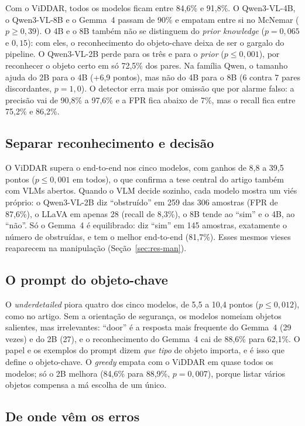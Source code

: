 \documentclass[conference]{IEEEtran}
\begin{document}
Com o ViDDAR, todos os modelos ficam entre 84,6\% e 91,8\%. O Qwen3-VL-4B, o Qwen3-VL-8B e o Gemma~4
passam de 90\% e empatam entre si no McNemar ($p\geq 0{,}39$). O 4B e o 8B também não se distinguem do
\emph{prior knowledge} ($p=0{,}065$ e $0{,}15$): com eles, o reconhecimento do objeto-chave deixa de ser
o gargalo do pipeline. O Qwen3-VL-2B perde para os três e para o \emph{prior} ($p\leq 0{,}001$), por
reconhecer o objeto certo em só 72,5\% dos pares. Na família Qwen, o tamanho ajuda do 2B para o 4B
(+6,9 pontos), mas não do 4B para o 8B (6 contra 7 pares discordantes, $p=1{,}0$). O detector erra mais
por omissão que por alarme falso: a precisão vai de 90,8\% a 97,6\% e a FPR fica abaixo de 7\%, mas o
recall fica entre 75,2\% e 86,2\%.

\subsection{Separar reconhecimento e decisão}
O ViDDAR supera o end-to-end nos cinco modelos, com ganhos de 8,8 a 39,5 pontos ($p\leq 0{,}001$ em
todos), o que confirma a tese central do artigo também com VLMs abertos. Quando o VLM decide sozinho, cada
modelo mostra um viés próprio: o Qwen3-VL-2B diz ``obstruído'' em 259 das 306 amostras (FPR de 87,6\%),
o LLaVA em apenas 28 (recall de 8,3\%), o 8B tende ao ``sim'' e o 4B, ao ``não''. Só o Gemma~4 é
equilibrado: diz ``sim'' em 145 amostras, exatamente o número de obstruídas, e tem o melhor end-to-end
(81,7\%). Esses mesmos vieses reaparecem na manipulação (Seção~\ref{sec:res-man}).

\subsection{O prompt do objeto-chave}
O \emph{underdetailed} piora quatro dos cinco modelos, de 5,5 a 10,4 pontos ($p\leq 0{,}012$), como no
artigo. Sem a orientação de segurança, os modelos nomeiam objetos salientes, mas irrelevantes: ``door''
é a resposta mais frequente do Gemma~4 (29 vezes) e do 2B (27), e o reconhecimento do Gemma~4 cai de
88,6\% para 62,1\%. O papel e os exemplos do prompt dizem \emph{que tipo} de objeto importa, e é isso que
define o objeto-chave. O \emph{greedy} empata com o ViDDAR em quase todos os modelos; só o 2B melhora
(84,6\% para 88,9\%, $p=0{,}007$), porque listar vários objetos compensa a má escolha de um único.

\subsection{De onde vêm os erros}
\label{sec:obs-erros}
\end{document}
